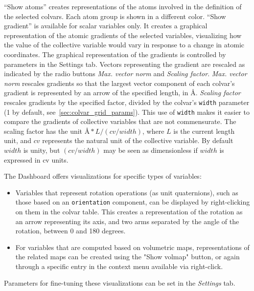 {``Show atoms'' creates representations of the atoms involved in the definition of the selected colvars.
Each atom group is shown in a different color.
``Show gradient'' is available for scalar variables only.
It creates a graphical representation of the atomic gradients of the selected variables, visualizing how the value of the collective variable would vary in response to a change in atomic coordinates.
The graphical representation of the gradients is controlled by parameters in the Settings tab.
Vectors representing the gradient are rescaled as indicated by the radio buttons \emph{Max. vector norm} and \emph{Scaling factor}.
\emph{Max. vector norm} rescales gradients so that the largest vector component of each colvar's gradient is represented by an arrow of the specified length, in \AA.
\emph{Scaling factor} rescales gradients by the specified factor, divided by the colvar's \texttt{width} parameter (1 by default, see~\ref{sec:colvar_grid_params}).
This use of \texttt{width} makes it easier to compare the gradients of collective variables that are not commensurate.
The scaling factor has the unit $\text{\AA} * L / (cv / width)$, where $L$ is the current length unit, and $cv$ represents the natural unit of the collective variable.
By default $width$ is unity, but $(cv / width)$ may be seen as dimensionless if $width$ is expressed in cv units.

The Dashboard offers visualizations for specific types of variables:
\begin{itemize}
  \item Variables that represent rotation operations (as unit quaternions), such as those based on an \texttt{orientation} component, can be displayed by right-clicking on them in the colvar table.
  This creates a representation of the rotation as an arrow representing its axis, and two arms separated by the angle of the rotation, between 0 and 180 degrees.
  \item For variables that are computed based on volumetric maps, representations of the related maps can be created using the "Show volmap" button, or again through a specific entry in the context menu available via right-click.
\end{itemize}
Parameters for fine-tuning these visualizations can be set in the \textit{Settings} tab.



}
